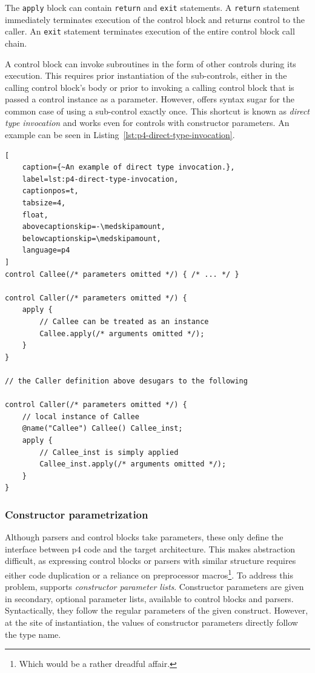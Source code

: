 The \texttt{apply} block can contain \texttt{return} and \texttt{exit}
statements. A \texttt{return} statement immediately terminates execution of the
control block and returns control to the caller. An \texttt{exit} statement
terminates execution of the entire control block call chain.

A control block can invoke subroutines in the form of other controls during its
execution. This requires prior instantiation of the sub-controls, either in the
calling control block's body or prior to invoking a calling control block that
is passed a control instance as a parameter. However, \pfs offers syntax
sugar for the common
case of using a sub-control exactly once. This shortcut is known as \emph{direct
type invocation} and works even for controls with constructor
parameters. An example can be seen in
Listing~\ref{lst:p4-direct-type-invocation}.

\begin{lstlisting}[
	caption={~An example of direct type invocation.},
	label=lst:p4-direct-type-invocation,
	captionpos=t,
	tabsize=4,
	float,
	abovecaptionskip=-\medskipamount,
	belowcaptionskip=\medskipamount,
	language=p4
]
control Callee(/* parameters omitted */) { /* ... */ }

control Caller(/* parameters omitted */) {
	apply {
		// Callee can be treated as an instance
		Callee.apply(/* arguments omitted */);
	}
}

// the Caller definition above desugars to the following

control Caller(/* parameters omitted */) {
	// local instance of Callee
	@name("Callee") Callee() Callee_inst;
	apply {
		// Callee_inst is simply applied
		Callee_inst.apply(/* arguments omitted */);
	}
}

\end{lstlisting}

\subsubsection*{Constructor parametrization}

Although parsers and control blocks take parameters, these only define the
interface between \acrshort{p4} code and the target architecture. This makes
abstraction difficult, as expressing control blocks or parsers with similar
structure requires either code duplication or a reliance on preprocessor
macros\footnote{Which would be a rather dreadful affair.}. To address this
problem, \pfs supports \emph{constructor parameter lists}. Constructor
parameters are given in secondary, optional parameter lists, available to
control blocks and parsers. Syntactically, they follow the regular parameters of
the given construct. However, at the site of instantiation, the values of
constructor parameters directly follow the type name.

